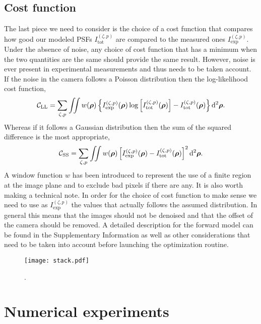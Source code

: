 \documentclass[reprint,aps,pra,superscriptaddress,
amsmath,amssymb]{revtex4-1}
\begin{document}
\subsection{Cost function}

The last piece we need to consider is the choice of a cost function that 
compares how good our modeled PSFs $I^{(\zeta ,p)}_\text{tot}$
are compared to the measured ones $I^{(\zeta ,p)}_\text{exp}$.
Under the absence of noise, any choice of cost function that has a minimum 
when the two quantities are the same should provide the same result. However,
noise is ever present in experimental measurements and thus needs to be taken
account. If the noise in the camera follows a Poisson distribution then the 
log-likelihood cost function,
\begin{align}
  \mathcal{C}_\text{LL} = \sum_{\zeta,p} \iint w(\boldsymbol \rho )\left\{ 
    I^{(\zeta ,p)}_\text{exp} (\boldsymbol \rho )
  \log \left[ I^{(\zeta ,p)}_\text{tot} (\boldsymbol \rho ) \right]
  - I^{(\zeta ,p)}_\text{tot} (\boldsymbol \rho )\right\} \mathrm{d}^2 \boldsymbol \rho.
\end{align}
Whereas if it follows a Gaussian distribution then the sum of the squared 
difference is the most appropriate,
\begin{align}
  \mathcal{C}_\text{SS} = \sum_{\zeta,p} \iint w(\boldsymbol \rho )\left[
    I^{(\zeta ,p)}_\text{exp} (\boldsymbol \rho )
  - I^{(\zeta ,p)}_\text{tot} (\boldsymbol \rho )\right]^2 \mathrm{d}^2 \boldsymbol \rho.
\end{align}
A window function $w$ has been introduced to represent the use of a finite
region at the image plane and to exclude bad pixels if there are any.
It is also worth making a technical note. In order for the choice of cost function 
to make sense we need to use as $I^{(\zeta ,p)}_\text{exp}$ the values that 
actually follows the assumed distribution. In general this means that the images
should not be denoised and that the offset of the camera should be removed.
A detailed description for the forward model can be found in the Supplementary 
Information as well as other considerations that need to be taken into account 
before launching the optimization routine. 

\begin{figure}
  \centering
  \texttt{[image: stack.pdf]}
  \caption{\label{fig:stack} . }
\end{figure}

\section{Numerical experiments}
\end{document}
